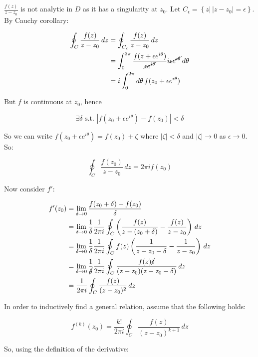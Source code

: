 \documentclass{physics_notes}
\begin{document}
$\frac{f(z)}{z - z_0}$ is not analytic in $D$ as it has a singularity at $z_0$. Let $C_\epsilon = \left\{ z \rvert \, |z - z_0 | = \epsilon \right\}$. By Cauchy corollary:

\begin{align*}
\oint_{C} \frac{f(z)}{z - z_0} \, dz &= \oint_{C_\epsilon} \frac{f(z)}{z - z_0} \, dz \\
&= \int^{2\pi}_0 \frac{f(z + \epsilon e^{i\theta})}{\cancel{\epsilon e^{i\theta}}} i \cancel{\epsilon e^{i\theta}} \, d\theta \\
&= i\int_0^{2\pi} d\theta \, f(z_0 + \epsilon e^{i\theta})
\end{align*}

But $f$ is continuous at $z_0$, hence

\[ \exists \delta \text{ s.t. } |f(z_0 + \epsilon e^{i\theta}) - f(z_0)| < \delta\]

So we can write $f(z_0 + \epsilon e^{i\theta}) = f(z_0) + \zeta$ where $|\zeta| < \delta$ and $|\zeta| \to 0$ as $\epsilon \to 0$. So:

\[ \oint_C \frac{f(z_0)}{z - z_0}\, dz = 2\pi i f(z_0) \]

Now consider $f'$:

\begin{align*}
f'(z_0) &= \lim_{\delta\to 0} \frac{f(z_0 + \delta) - f(z_0)}{\delta} \\
&= \lim_{\delta\to 0} \frac{1}{\delta} \frac{1}{2\pi i} \oint_C\left(\frac{f(z)}{z - (z_0 + \delta)} - \frac{f(z)}{z - z_0}\right)\, dz \\
&= \lim_{\delta\to 0} \frac{1}{\delta} \frac{1}{2\pi i} \oint_C f(z) \left(\frac{1}{z - z_0 - \delta} - \frac{1}{z - z_0}\right)\, dz \\
&= \lim_{\delta\to 0} \frac{1}{\cancel{\delta}} \frac{1}{2\pi i} \oint_C \frac{f(z)\cancel{\delta}}{(z-z_0)(z-z_0-\delta)}\, dz \\
&= \frac{1}{2\pi i}\oint_C \frac{f(z)}{(z-z_0)^2} \, dz
\end{align*}

In order to inductively find a general relation, assume that the following holds:

\begin{equation}\label{eq:integral_formula}
f^{(k)}(z_0) =  \frac{k!}{2\pi i } \oint_C \frac{f(z)}{(z - z_0)^{k+1}} \, dz 
\end{equation}

So, using the definition of the derivative:
\end{document}
